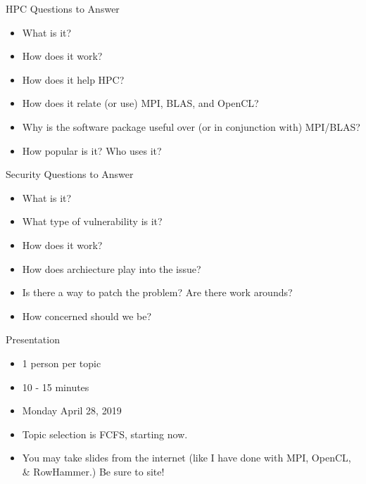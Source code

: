 \documentclass{beamer}
\begin{document}
\begin{frame}{HPC Questions to Answer}
\begin{itemize}
\item What is it?
\item How does it work?
\item How does it help HPC?
\item How does it relate (or use) MPI, BLAS, and OpenCL?
\item Why is the software package useful over (or in conjunction with) MPI/BLAS?
\item How popular is it? Who uses it?
\end{itemize}
\end{frame}

\begin{frame}{Security Questions to Answer}
\begin{itemize}
\item What is it?
\item What type of vulnerability is it?
\item How does it work?
\item How does archiecture play into the issue?
\item Is there a way to patch the problem?  Are there work arounds?
\item How concerned should we be?
\end{itemize}
\end{frame}

\begin{frame}{Presentation}
\begin{itemize}
\item 1 person per topic
\item 10 - 15 minutes
\item Monday April 28, 2019
\item Topic selection is FCFS, starting now.
\item You may take slides from the internet (like I have done with MPI, OpenCL, \& RowHammer.) Be sure to site!
\end{itemize}
\end{frame}
\end{document}
